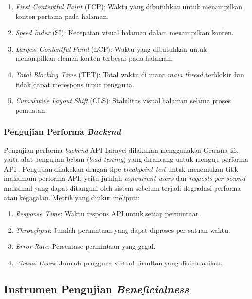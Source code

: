\begin{enumerate}[label=\alph*.]
	\item \textit{First Contentful Paint} (FCP): Waktu yang dibutuhkan untuk menampilkan konten pertama pada halaman.
	\item \textit{Speed Index} (SI): Kecepatan visual halaman dalam menampilkan konten.
	\item \textit{Largest Contentful Paint} (LCP): Waktu yang dibutuhkan untuk menampilkan elemen konten terbesar pada halaman.
	\item \textit{Total Blocking Time} (TBT): Total waktu di mana \textit{main thread} terblokir dan tidak dapat merespons input pengguna.
	\item \textit{Cumulative Layout Shift} (CLS): Stabilitas visual halaman selama proses pemuatan.
\end{enumerate}

\subsubsection{Pengujian Performa \textit{Backend}}

Pengujian performa \textit{backend} API Laravel dilakukan menggunakan Grafana k6, yaitu alat pengujian beban (\textit{load testing}) yang dirancang untuk menguji performa API \citep{Grafana_2026_k6}. Pengujian dilakukan dengan tipe \textit{breakpoint test} untuk menemukan titik maksimum performa API, yaitu jumlah \textit{concurrent users} dan \textit{requests per second} maksimal yang dapat ditangani oleh sistem sebelum terjadi degradasi performa atau kegagalan. Metrik yang diukur meliputi:

\begin{enumerate}[label=\alph*.]
	\item \textit{Response Time}: Waktu respons API untuk setiap permintaan.
	\item \textit{Throughput}: Jumlah permintaan yang dapat diproses per satuan waktu.
	\item \textit{Error Rate}: Persentase permintaan yang gagal.
	\item \textit{Virtual Users}: Jumlah pengguna virtual simultan yang disimulasikan.
\end{enumerate}

\subsection{Instrumen Pengujian \textit{Beneficialness}}

